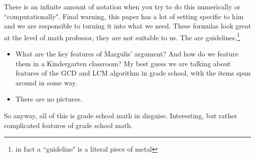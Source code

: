 \documentclass[12pt]{article}
\begin{document}
There is an infinite amount of notation when you try to do this numerically or ``computationally".  Final warning, this paper has a lot of setting specific to him and we are responsible to turning it into what we need. These formulas look great at the level of math professor, they are not suitable to us.  The are guidelines.\footnote{in fact a ``guideline" is a literal piece of metal} 
\begin{itemize}
\item What are the key features of Margulis' argument?  And how do we feature them in a Kindergarten classroom? My best guess we are talking about features of the GCD and LCM algorithm in grade school, with the items spun around in some way.
\item There are no pictures.
\end{itemize}
So anyway, all of this is grade school math in disguise.  Interesting, but rather complicated features of grade school math.

\newpage
\end{document}
